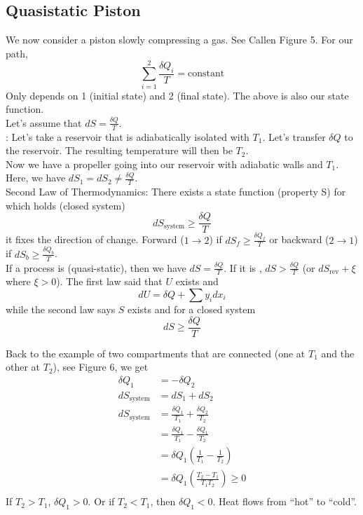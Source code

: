 \documentclass[12pt]{article}
\begin{document}
\subsection{Quasistatic Piston}
We now consider a piston slowly compressing a gas. See Callen Figure 5.  For our path,
\begin{equation}
\sum_{i=1}^2 \frac{\delta Q_i}{T} = \text{constant}
\end{equation}
Only depends on 1 (initial state) and 2 (final state).  The above is also our state function.\\

Let's assume that $dS = \frac{\delta Q}{T}$.\\
: Let's take a reservoir that is adiabatically isolated with $T_1$.  Let's transfer $\delta Q$ to the reservoir.  The resulting temperature will then be $T_2$.\\
 Now we have a propeller going into our reservoir with adiabatic walls and $T_1$.  Here, we have $dS_1 = dS_2 \neq \frac{\delta Q}{T}$.\\

Second Law of Thermodynamics:  There exists a state function (property S) for which holds (closed system)
\begin{equation}
dS_\text{system} \geq \frac{\delta Q}{T}
\end{equation}
it fixes the direction of change.  Forward ($1\rightarrow 2$) if $dS_f \geq \frac{\delta Q_f}{T}$ or backward ($2\rightarrow 1$) if $dS_b \geq \frac{\delta Q_b}{T}$.\\

If a process is  (quasi-static), then we have $dS = \frac{\delta Q}{T}$.  If it is , $dS > \frac{\delta Q}{T}$ (or $dS_\text{rev} + \xi$ where $\xi >0$).  The first law said that $U$ exists and
\begin{equation}
dU = \delta Q + \sum y_i dx_i
\end{equation}
while the second law says $S$ exists and for a closed system
\begin{equation}
dS \geq \frac{\delta Q}{T}
\end{equation}

Back to the example of two compartments that are connected (one at $T_1$ and the other at $T_2$), see Figure 6, we get
\begin{align*}
\delta Q_1 &= -\delta Q_2\\
dS_\text{system} &= dS_1 + dS_2\\
dS_\text{system} &= \frac{\delta Q_1}{T_1} + \frac{\delta Q_2}{T_2}\\
&= \frac{\delta Q_1}{T_1} - \frac{\delta Q_1}{T_2}\\
&= \delta Q_1 (\frac{1}{T_1} - \frac{1}{T_2})\\
&= \delta Q_1 (\frac{T_2 - T_1}{T_1 T_2}) \geq 0\\
\end{align*}
If $T_2 > T_1$, $\delta Q_1 > 0$.  Or if $T_2 < T_1$, then $\delta Q_1 < 0$.  Heat flows from ``hot'' to ``cold''.
\end{document}
